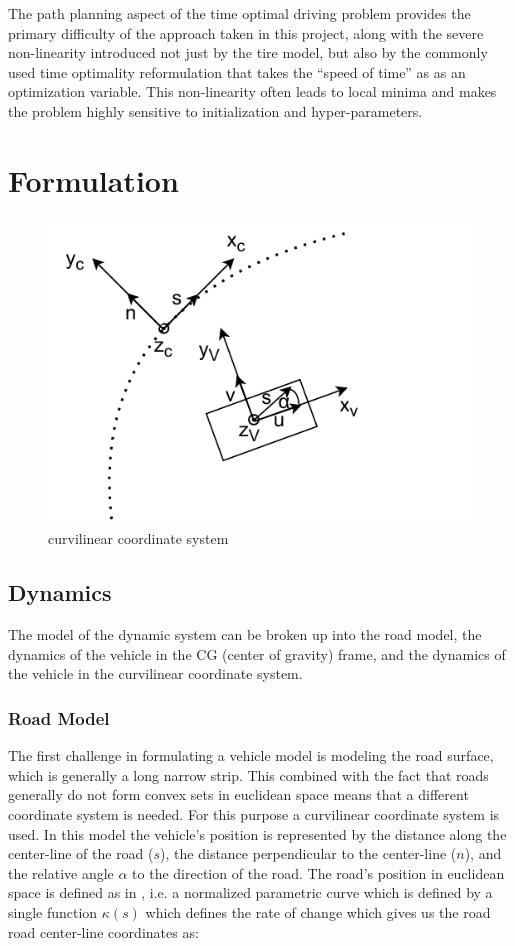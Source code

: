 \documentclass[conference,11pt]{IEEEtran}
\begin{document}
The path planning aspect of the time optimal driving problem provides the primary difficulty of the approach taken in this project, along with the severe non-linearity introduced not just by the
tire model, but also by the commonly used time optimality reformulation that takes the ``speed of time'' as as an optimization variable. This non-linearity often leads to local minima and makes the
problem highly sensitive to initialization and hyper-parameters.

\section{Formulation}
\begin{figure}[t]
  \centering
  \includegraphics{curvilinear2.pdf}
  \caption{curvilinear coordinate system}
  \label{fig:curv}
\end{figure}
\subsection{Dynamics}
The model of the dynamic system can be broken up into the road model, the dynamics of the vehicle in the CG (center of gravity) frame, and the dynamics of the vehicle in the
curvilinear coordinate system.

\subsubsection{Road Model}
The first challenge in formulating a vehicle model is modeling the road surface, which is generally a long narrow strip. This combined with the fact that roads generally do not
form convex sets in euclidean space means that a different coordinate system is needed. For this purpose a curvilinear coordinate system is used. In this model the vehicle's
position is represented by the distance along the center-line of the road ($s$), the distance perpendicular to the center-line ($n$), and the relative angle $\alpha$ to the direction
of the road. The road's position in euclidean space is defined as in \cite{LOT20147559}, i.e. a normalized parametric curve which is defined by a single function $\kappa(s)$ which defines
the rate of change which gives us the road road center-line coordinates as:
\end{document}
